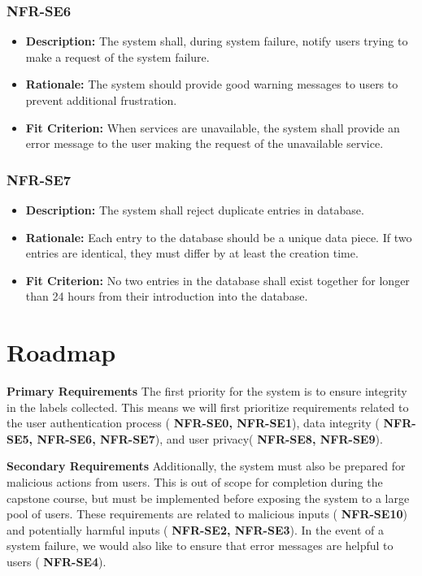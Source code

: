 \documentclass{article}
\begin{document}
\subsubsection*{NFR-SE6}
\begin{itemize}
  \item \textbf{Description:} The system shall, during system failure, notify users trying to make a request of the system failure.
  \item \textbf{Rationale:} The system should provide good warning messages to users to prevent additional frustration.
  \item \textbf{Fit Criterion:} When services are unavailable, the system shall provide an error message to the user making the request of the unavailable service.
\end{itemize}

\subsubsection*{NFR-SE7}
\begin{itemize}
  \item \textbf{Description:} The system shall reject duplicate entries in database.
  \item \textbf{Rationale:} Each entry to the database should be a unique data piece. If two entries are identical, they must differ by at least the creation time.
  \item \textbf{Fit Criterion:} No two entries in the database shall exist together for longer than 24 hours from their introduction into the database.
\end{itemize}



\section{Roadmap}

\textbf{Primary Requirements}
The first priority for the system is to ensure integrity in the labels collected. This means we will first prioritize requirements
related to the user authentication process (
\textbf{NFR-SE0, NFR-SE1}), data integrity (
  \textbf{NFR-SE5, NFR-SE6, NFR-SE7}), and user privacy(
    \textbf{NFR-SE8, NFR-SE9}).

\textbf{Secondary Requirements}
Additionally, the system must also be prepared for malicious actions from users. This is out of scope for completion during the capstone course, but must be implemented
before exposing the system to a large pool of users. These requirements are related to malicious inputs (
  \textbf{NFR-SE10}) and potentially harmful inputs (
    \textbf{NFR-SE2, NFR-SE3}). In the event of a system failure, we would also like to ensure that error messages are helpful to users (
      \textbf{NFR-SE4}).
\end{document}
